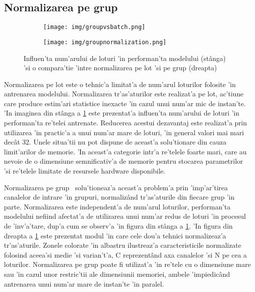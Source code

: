 \documentclass[12pt,a4paper,twoside]{report}
\begin{document}
\subsection{Normalizarea pe grup}
\begin{figure}[H]
\centering
\begin{subfigure}[b]{.5\textwidth}
  \texttt{[image: img/groupvsbatch.png]}
  \centering
\end{subfigure}%
\begin{subfigure}[b]{.5\textwidth}
  \texttt{[image: img/groupnormalization.png]}
  \centering
\end{subfigure}
\caption{Influen'ta num'arului de loturi 'in performan'ta modelului (st\^anga) 'si o compara'tie 'intre normalizarea pe lot 'si pe grup (dreapta) \protect \footnotemark}
\label{fig:groupnormalization}
\end{figure}

Normalizarea pe lot este o tehnic'a limitat'a de num'arul loturilor folosite 'in antrenarea modelului. Normalizarea tr'as'aturilor este realizat'a pe lot, ac'tiune care produce estim'ari statistice inexacte 'in cazul unui num'ar mic de instan'te. 'In imaginea din st\^anga a \ref{fig:groupnormalization} este prezentat'a influen'ta num'arului de loturi 'in performan'ta re'telei antrenate. Reducerea acestui dezavantaj este realizat'a prin utilizarea 'in practic'a a unui num'ar mare de loturi, 'in general valori mai mari dec\^at 32. Unele situa'tii nu pot dispune de aceast'a solu'tionare din cauza limit'arilor de memorie. 'In aceast'a categorie intr'a re'telele foarte mari, care au nevoie de o dimensiune semnificativ'a de memorie pentru stocarea parametrilor 'si re'telele limitate de resursele hardware disponibile. 

Normalizarea pe grup~\cite{GroupNormalization} solu'tioneaz'a aceast'a problem'a prin 'imp'ar'tirea canalelor de intrare 'in grupuri, normaliz\^and tr'as'aturile din fiecare grup 'in parte. Normalizarea este independent'a de num'arul loturilor, performan'ta modelului nefiind afectat'a de utilizarea unui num'ar redus de loturi 'in procesul de 'inv'a'tare, dup'a cum se observ'a 'in figura din st\^anga a \ref{fig:groupnormalization}. 'In figura din dreapta a \ref{fig:groupnormalization} este prezentat modul 'in care cele dou'a tehnici normalizeaz'a tr'as'aturile. Zonele colorate 'in albastru ilustreaz'a caracteristicile normalizate folosind aceea'si medie 'si varian't'a, C reprezent\^and axa canalelor 'si N pe cea a loturilor. Normalizarea pe grup poate fi utilizat'a 'in re'tele cu o dimensiune mare sau 'in cazul unor restric'tii ale dimensiunii memoriei, ambele 'impiedic\^and antrenarea unui num'ar mare de instan'te 'in paralel.
\end{document}
